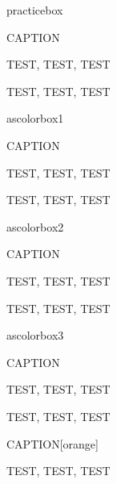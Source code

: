 practicebox
\begin{practicebox}{CAPTION}

TEST, TEST, TEST

\end{practicebox}

\begin{practicebox}{}

TEST, TEST, TEST

\end{practicebox}

ascolorbox1

\begin{ascolorbox1}{CAPTION}

TEST, TEST, TEST

\end{ascolorbox1}

\begin{ascolorbox1}{}

TEST, TEST, TEST

\end{ascolorbox1}

ascolorbox2

\begin{ascolorbox2}{CAPTION}

TEST, TEST, TEST

\end{ascolorbox2}

\begin{ascolorbox2}{}

TEST, TEST, TEST

\end{ascolorbox2}

ascolorbox3

\begin{ascolorbox3}{CAPTION}

TEST, TEST, TEST

\end{ascolorbox3}

\begin{ascolorbox3}{}

TEST, TEST, TEST

\end{ascolorbox3}

\begin{ascolorbox3}{CAPTION}[orange]

TEST, TEST, TEST

\end{ascolorbox3}

